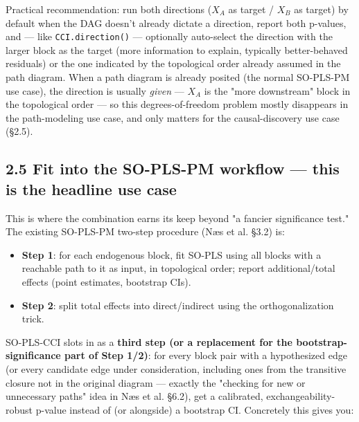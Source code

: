 \documentclass[11pt,a4paper]{article}
\begin{document}
	Practical recommendation: run both directions (\(X_A\) as target / \(X_B\) as target) by default when the DAG doesn't already dictate a direction, report both p-values, and — like \texttt{CCI.direction()} — optionally auto-select the direction with the larger block as the target (more information to explain, typically better-behaved residuals) or the one indicated by the topological order already assumed in the path diagram. When a path diagram is already posited (the normal SO-PLS-PM use case), the direction is usually \emph{given} — \(X_A\) is the "more downstream" block in the topological order — so this degrees-of-freedom problem mostly disappears in the path-modeling use case, and only matters for the causal-discovery use case (\S{}2.5).
	
	\subsection{2.5 Fit into the SO-PLS-PM workflow — this is the headline use case}
	
	This is where the combination earns its keep beyond "a fancier significance test." The existing SO-PLS-PM two-step procedure (Næs et al. \S{}3.2) is:
	
	\begin{itemize}
		\item \textbf{Step 1}: for each endogenous block, fit SO-PLS using all blocks with a reachable path to it as input, in topological order; report additional/total effects (point estimates, bootstrap CIs).
		\item \textbf{Step 2}: split total effects into direct/indirect using the orthogonalization trick.
		
	\end{itemize}
	SO-PLS-CCI slots in as a \textbf{third step (or a replacement for the bootstrap-significance part of Step 1/2)}: for every block pair with a hypothesized edge (or every candidate edge under consideration, including ones from the transitive closure not in the original diagram — exactly the "checking for new or unnecessary paths" idea in Næs et al. \S{}6.2), get a calibrated, exchangeability-robust p-value instead of (or alongside) a bootstrap CI. Concretely this gives you:
	
\end{document}
